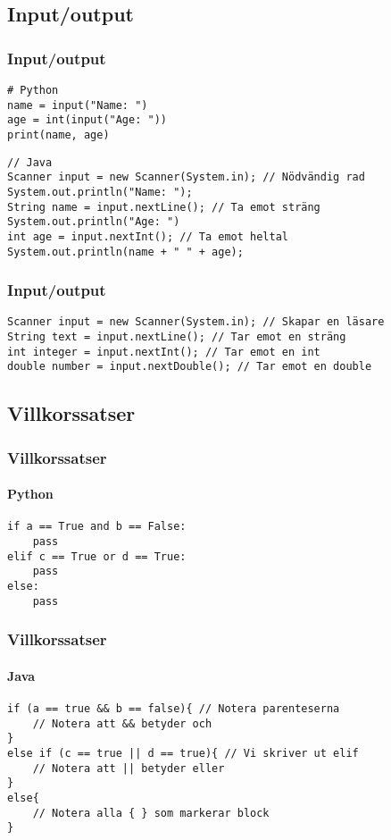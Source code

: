 \documentclass[aspectratio=169]{beamer}
\begin{document}
\subsection{Input/output}

\begin{frame}[fragile]
    \frametitle{Input/output}

    \begin{lstlisting}[style=python]
# Python
name = input("Name: ")
age = int(input("Age: "))
print(name, age)
    \end{lstlisting}

    \begin{lstlisting}[style=java]
// Java
Scanner input = new Scanner(System.in); // Nödvändig rad
System.out.println("Name: ");
String name = input.nextLine(); // Ta emot sträng
System.out.println("Age: ")
int age = input.nextInt(); // Ta emot heltal
System.out.println(name + " " + age);
    \end{lstlisting}

\end{frame}

\begin{frame}[fragile]
    \frametitle{Input/output}

    \begin{lstlisting}[style=java]
Scanner input = new Scanner(System.in); // Skapar en läsare
String text = input.nextLine(); // Tar emot en sträng
int integer = input.nextInt(); // Tar emot en int
double number = input.nextDouble(); // Tar emot en double
    \end{lstlisting}

\end{frame}

\subsection{Villkorssatser}

\begin{frame}[fragile]
    \frametitle{Villkorssatser}
    \framesubtitle{Python}

    \begin{lstlisting}[style=python]
if a == True and b == False:
    pass
elif c == True or d == True:
    pass
else:
    pass
    \end{lstlisting}

\end{frame}

\begin{frame}[fragile]
    \frametitle{Villkorssatser}
    \framesubtitle{Java}

    \begin{lstlisting}[style=java]
if (a == true && b == false){ // Notera parenteserna
    // Notera att && betyder och
}
else if (c == true || d == true){ // Vi skriver ut elif
    // Notera att || betyder eller
}
else{
    // Notera alla { } som markerar block
}
    \end{lstlisting}

\end{frame}
\end{document}
